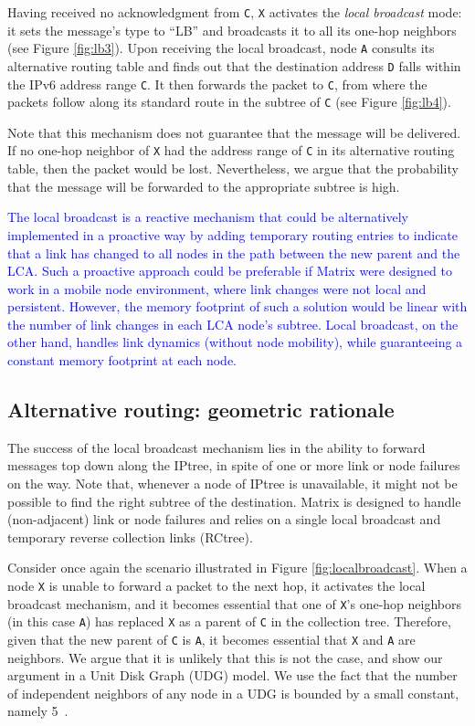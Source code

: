 Having received no acknowledgment from \texttt{C}, \texttt{X} activates the \textit{local broadcast} mode: it sets the message's type to ``LB'' and broadcasts it to all its one-hop neighbors (see Figure \ref{fig:lb3}). Upon receiving the local broadcast, node \texttt{A} consults its alternative routing table and finds out that the destination address \texttt{D} falls within the IPv6 address range \texttt{C}. It then forwards the packet to \texttt{C}, from where the packets follow along its standard route in the subtree of \texttt{C} (see Figure \ref{fig:lb4}).

Note that this mechanism does not guarantee that the message will be delivered. If no one-hop neighbor of \texttt{X} had the address range of \texttt{C} in its alternative routing table, then the packet would be lost. Nevertheless, we argue that the probability that the message will be forwarded to the appropriate subtree is high.

\textcolor{blue}{The local broadcast is a reactive mechanism that could be alternatively implemented in a proactive way by adding temporary routing entries to indicate that a link has changed to all nodes in the path between the new parent and the LCA.
	Such a proactive approach could be preferable if Matrix were designed to work in a mobile node environment,
	where link changes were not local and persistent. However, the memory footprint of such a
	solution would be linear with the number of link changes in each LCA node's
	subtree. Local broadcast, on the other hand, handles link dynamics (without node mobility), while guaranteeing a constant memory
	footprint at each node.}

\subsection{Alternative routing: geometric rationale}

The success of the local broadcast mechanism lies in the ability to forward messages top down along the IPtree, in spite of one or more link or node failures on the way. Note that, whenever a node of IPtree is unavailable, it might not be possible to find the right subtree of the destination. Matrix is designed to handle (non-adjacent) link or node failures and relies on a single local broadcast and temporary reverse collection links (RCtree).

Consider once again the scenario illustrated in Figure \ref{fig:localbroadcast}. When a node \texttt{X} is unable to forward a packet to the next hop, it activates the local broadcast mechanism, and it becomes essential that one of \texttt{X}'s one-hop neighbors (in this case \texttt{A}) has replaced \texttt{X} as a parent of \texttt{C} in the collection tree. Therefore, given that the new parent of \texttt{C} is \texttt{A}, it becomes essential that \texttt{X} and \texttt{A} are neighbors. We argue that it is unlikely that this is not the case, and show our argument in a Unit Disk Graph (UDG) model. We use the fact that the number of independent neighbors of any node in a UDG is bounded by a small constant, namely 5~\cite{Clark:1991}.

